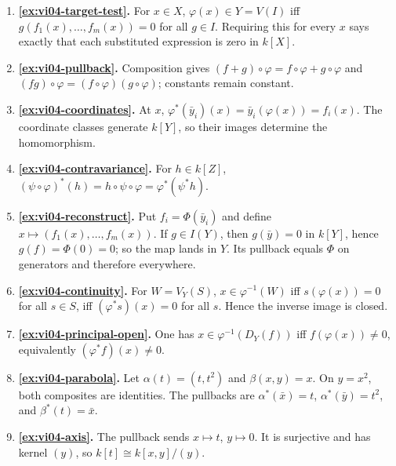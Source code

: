 \begin{enumerate}[label=\textbf{E\arabic*.},leftmargin=*,itemsep=1em]
\item \textbf{\cref{ex:vi04-target-test}.}  For \(x\in X\), \(\varphi(x)\in Y=V(I)\) iff
\(g(f_1(x),\dots,f_m(x))=0\) for all \(g\in I\).  Requiring this for every \(x\) says
exactly that each substituted expression is zero in \(k[X]\).

\item \textbf{\cref{ex:vi04-pullback}.}  Composition gives
\((f+g)\circ\varphi=f\circ\varphi+g\circ\varphi\) and
\((fg)\circ\varphi=(f\circ\varphi)(g\circ\varphi)\); constants remain constant.

\item \textbf{\cref{ex:vi04-coordinates}.}  At \(x\),
\(\varphi^*(\bar y_i)(x)=\bar y_i(\varphi(x))=f_i(x)\).  The coordinate classes generate
\(k[Y]\), so their images determine the homomorphism.

\item \textbf{\cref{ex:vi04-contravariance}.}  For \(h\in k[Z]\),
\((\psi\circ\varphi)^*(h)=h\circ\psi\circ\varphi=\varphi^*(\psi^*h)\).

\item \textbf{\cref{ex:vi04-reconstruct}.}  Put \(f_i=\Phi(\bar y_i)\) and define
\(x\mapsto(f_1(x),\dots,f_m(x))\).  If \(g\in I(Y)\), then
\(g(\bar y)=0\) in \(k[Y]\), hence \(g(f)=\Phi(0)=0\); so the map lands in \(Y\).
Its pullback equals \(\Phi\) on generators and therefore everywhere.

\item \textbf{\cref{ex:vi04-continuity}.}  For \(W=V_Y(S)\),
\(x\in\varphi^{-1}(W)\) iff \(s(\varphi(x))=0\) for all \(s\in S\), iff
\((\varphi^*s)(x)=0\) for all \(s\).  Hence the inverse image is closed.

\item \textbf{\cref{ex:vi04-principal-open}.}  One has
\(x\in\varphi^{-1}(D_Y(f))\) iff \(f(\varphi(x))\neq0\), equivalently
\((\varphi^*f)(x)\neq0\).

\item \textbf{\cref{ex:vi04-parabola}.}  Let \(\alpha(t)=(t,t^2)\) and
\(\beta(x,y)=x\).  On \(y=x^2\), both composites are identities.  The pullbacks are
\(\alpha^*(\bar x)=t\), \(\alpha^*(\bar y)=t^2\), and \(\beta^*(t)=\bar x\).

\item \textbf{\cref{ex:vi04-axis}.}  The pullback sends \(x\mapsto t\), \(y\mapsto0\).
It is surjective and has kernel \((y)\), so \(k[t]\cong k[x,y]/(y)\).


\end{enumerate}
